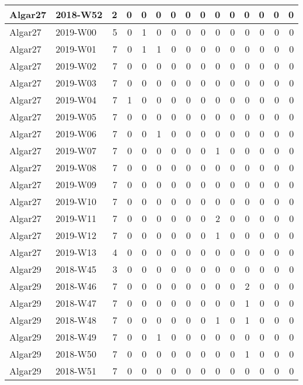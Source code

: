 \documentclass[]{book}
\begin{document}
\begin{table}
\begin{tabular}[t]{l|l|r|r|r|r|r|r|r|r|r|r|r|r|r}
\hline
Algar27 & 2018-W52 & 2 & 0 & 0 & 0 & 0 & 0 & 0 & 0 & 0 & 0 & 0 & 0 & 0\\
\hline
Algar27 & 2019-W00 & 5 & 0 & 1 & 0 & 0 & 0 & 0 & 0 & 0 & 0 & 0 & 0 & 0\\
\hline
Algar27 & 2019-W01 & 7 & 0 & 1 & 1 & 0 & 0 & 0 & 0 & 0 & 0 & 0 & 0 & 0\\
\hline
Algar27 & 2019-W02 & 7 & 0 & 0 & 0 & 0 & 0 & 0 & 0 & 0 & 0 & 0 & 0 & 0\\
\hline
Algar27 & 2019-W03 & 7 & 0 & 0 & 0 & 0 & 0 & 0 & 0 & 0 & 0 & 0 & 0 & 0\\
\hline
Algar27 & 2019-W04 & 7 & 1 & 0 & 0 & 0 & 0 & 0 & 0 & 0 & 0 & 0 & 0 & 0\\
\hline
Algar27 & 2019-W05 & 7 & 0 & 0 & 0 & 0 & 0 & 0 & 0 & 0 & 0 & 0 & 0 & 0\\
\hline
Algar27 & 2019-W06 & 7 & 0 & 0 & 1 & 0 & 0 & 0 & 0 & 0 & 0 & 0 & 0 & 0\\
\hline
Algar27 & 2019-W07 & 7 & 0 & 0 & 0 & 0 & 0 & 0 & 1 & 0 & 0 & 0 & 0 & 0\\
\hline
Algar27 & 2019-W08 & 7 & 0 & 0 & 0 & 0 & 0 & 0 & 0 & 0 & 0 & 0 & 0 & 0\\
\hline
Algar27 & 2019-W09 & 7 & 0 & 0 & 0 & 0 & 0 & 0 & 0 & 0 & 0 & 0 & 0 & 0\\
\hline
Algar27 & 2019-W10 & 7 & 0 & 0 & 0 & 0 & 0 & 0 & 0 & 0 & 0 & 0 & 0 & 0\\
\hline
Algar27 & 2019-W11 & 7 & 0 & 0 & 0 & 0 & 0 & 0 & 2 & 0 & 0 & 0 & 0 & 0\\
\hline
Algar27 & 2019-W12 & 7 & 0 & 0 & 0 & 0 & 0 & 0 & 1 & 0 & 0 & 0 & 0 & 0\\
\hline
Algar27 & 2019-W13 & 4 & 0 & 0 & 0 & 0 & 0 & 0 & 0 & 0 & 0 & 0 & 0 & 0\\
\hline
Algar29 & 2018-W45 & 3 & 0 & 0 & 0 & 0 & 0 & 0 & 0 & 0 & 0 & 0 & 0 & 0\\
\hline
Algar29 & 2018-W46 & 7 & 0 & 0 & 0 & 0 & 0 & 0 & 0 & 0 & 2 & 0 & 0 & 0\\
\hline
Algar29 & 2018-W47 & 7 & 0 & 0 & 0 & 0 & 0 & 0 & 0 & 0 & 1 & 0 & 0 & 0\\
\hline
Algar29 & 2018-W48 & 7 & 0 & 0 & 0 & 0 & 0 & 0 & 1 & 0 & 1 & 0 & 0 & 0\\
\hline
Algar29 & 2018-W49 & 7 & 0 & 0 & 1 & 0 & 0 & 0 & 0 & 0 & 0 & 0 & 0 & 0\\
\hline
Algar29 & 2018-W50 & 7 & 0 & 0 & 0 & 0 & 0 & 0 & 0 & 0 & 1 & 0 & 0 & 0\\
\hline
Algar29 & 2018-W51 & 7 & 0 & 0 & 0 & 0 & 0 & 0 & 0 & 0 & 0 & 0 & 0 & 0\\

\end{tabular}
\end{table}
\end{document}
